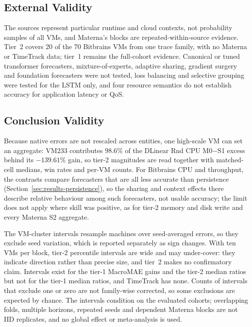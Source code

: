 \documentclass[5p,twocolumn]{elsarticle}
\begin{document}
\subsection{External Validity}
\label{sec:threats-external}

The sources represent particular runtime and cloud contexts, not probability
samples of all VMs, and Materna's blocks are repeated-within-source evidence.
Tier~2 covers 20 of the 70 Bitbrains VMs from one trace family, with no
Materna or TimeTrack data; tier~1 remains the full-cohort evidence. Canonical
or tuned transformer forecasters, mixture-of-experts, adaptive sharing,
gradient surgery and foundation forecasters were not tested, loss balancing
and selective grouping were tested for the LSTM only, and four resource
semantics do not establish accuracy for application latency or QoS.

\subsection{Conclusion Validity}
\label{sec:threats-conclusion}

Because native errors are not rescaled across entities, one high-scale VM
can set an aggregate: VM233 contributes $98.6\%$ of the DLinear Rnd CPU
M0$-$S1 excess behind its $-139.61\%$ gain, so tier-2 magnitudes are read
together with matched-cell medians, win rates and per-VM counts. For
Bitbrains CPU and throughput, the contrasts compare forecasters that are all
less accurate than persistence (Section~\ref{sec:results-persistence}), so
the sharing and context effects there describe relative behaviour among such
forecasters, not usable accuracy; the limit does not apply where skill was
positive, as for tier-2 memory and disk write and every Materna S2 aggregate.

The VM-cluster intervals resample machines over seed-averaged errors, so they
exclude seed variation, which is reported separately as sign changes. With
ten VMs per block, tier-2 percentile intervals are wide and may under-cover:
they indicate direction rather than precise size, and tier~2 makes no
confirmatory claim. Intervals exist for the tier-1 MacroMAE gains and the
tier-2 median ratios but not for the tier-1 median ratios, and TimeTrack has
none. Counts of intervals that exclude one or zero are not family-wise
corrected, so some exclusions are expected by chance. The intervals condition
on the evaluated cohorts; overlapping folds, multiple horizons, repeated seeds
and dependent Materna blocks are not IID replicates, and no global effect or
meta-analysis is used.
\end{document}
